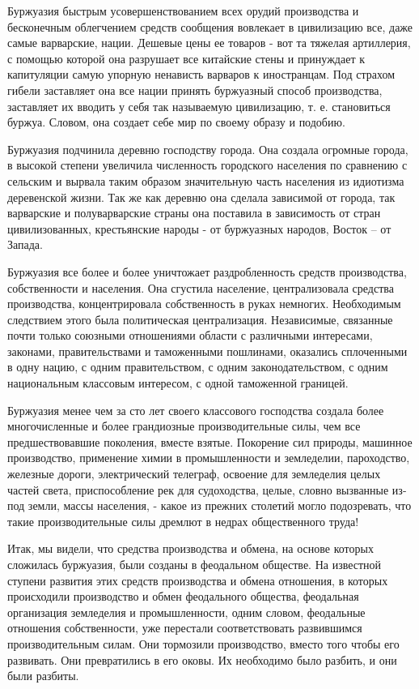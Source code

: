 \documentclass[12pt]{article}
\newcommand{\parnum}{(\arabic{parcount})}
\newcounter{parcount}
\newenvironment{parnumbers}{%
  \par%
  \everypar{\noindent \stepcounter{parcount}\marginpar[]{\parnum}}%
}{}
\begin{document}
\begin{parnumbers}
    Буржуазия быстрым усовершенствованием всех орудий производства и бесконечным облегчением средств сообщения вовлекает в цивилизацию все, даже самые варварские, нации. Дешевые цены ее товаров - вот та тяжелая артиллерия, с помощью которой она разрушает все китайские стены и принуждает к капитуляции самую упорную ненависть варваров к иностранцам. Под страхом гибели заставляет она все нации принять буржуазный способ производства, заставляет их вводить у себя так называемую цивилизацию, т. е. становиться буржуа. Словом, она создает себе мир по своему образу и подобию.

    Буржуазия подчинила деревню господству города. Она создала огромные города, в высокой степени увеличила численность городского населения по сравнению с сельским и вырвала таким образом значительную часть населения из идиотизма деревенской жизни. Так же как деревню она сделала зависимой от города, так варварские и полуварварские страны она поставила в зависимость от стран цивилизованных, крестьянские народы - от буржуазных народов, Восток – от Запада.

    Буржуазия все более и более уничтожает раздробленность средств производства, собственности и населения. Она сгустила население, централизовала средства производства, концентрировала собственность в руках немногих. Необходимым следствием этого была политическая централизация. Независимые, связанные почти только союзными отношениями области с различными интересами, законами, правительствами и таможенными пошлинами, оказались сплоченными в одну нацию, с одним правительством, с одним законодательством, с одним национальным классовым интересом, с одной таможенной границей.

    Буржуазия менее чем за сто лет своего классового господства создала более многочисленные и более грандиозные производительные силы, чем все предшествовавшие поколения, вместе взятые. Покорение сил природы, машинное производство, применение химии в промышленности и земледелии, пароходство, железные дороги, электрический телеграф, освоение для земледелия целых частей света, приспособление рек для судоходства, целые, словно вызванные из-под земли, массы населения, - какое из прежних столетий могло подозревать, что такие производительные силы дремлют в недрах общественного труда!

    Итак, мы видели, что средства производства и обмена, на основе которых сложилась буржуазия, были созданы в феодальном обществе. На известной ступени развития этих средств производства и обмена отношения, в которых происходили производство и обмен феодального общества, феодальная организация земледелия и промышленности, одним словом, феодальные отношения собственности, уже перестали соответствовать развившимся производительным силам. Они тормозили производство, вместо того чтобы его развивать. Они превратились в его оковы. Их необходимо было разбить, и они были разбиты.


\end{parnumbers}
\end{document}
